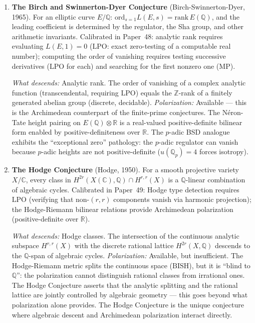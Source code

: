 \documentclass[11pt]{article}
\theoremstyle{definition}
\theoremstyle{remark}
\newcommand{\Z}{\mathbb{Z}}
\newcommand{\Q}{\mathbb{Q}}
\newcommand{\R}{\mathbb{R}}
\newcommand{\C}{\mathbb{C}}
\newcommand{\Qbar}{\overline{\Q}}
\newcommand{\Qp}{\Q_p}
\newcommand{\LPO}{\mathrm{LPO}}
\newcommand{\MP}{\mathrm{MP}}
\newcommand{\BISH}{\mathrm{BISH}}
\begin{document}
\begin{enumerate}
\emph{What descends:} The entire state space. Both the Hodge filtration (from $\Qp$-Grassmannians to $\Q$-rational de Rham cohomology) and the Frobenius traces (from $\Qp$ to $\Qbar$). \emph{Polarization:} Blocked by $u(\Qp) = 4$. The Corlette-Simpson correspondence over $\C$ uses a harmonic metric to force semisimplicity; over $\Qp$, purely algebraic workarounds (perfectoid spaces, Fargues-Fontaine curve) are required.

\item \textbf{The Birch and Swinnerton-Dyer Conjecture} (Birch-Swinnerton-Dyer, 1965). For an elliptic curve $E/\Q$: $\mathrm{ord}_{s=1} L(E,s) = \mathrm{rank}\, E(\Q)$, and the leading coefficient is determined by the regulator, the Sha group, and other arithmetic invariants. Calibrated in Paper~48: analytic rank requires evaluating $L(E,1) = 0$ ($\LPO$: exact zero-testing of a computable real number); computing the order of vanishing requires testing successive derivatives ($\LPO$ for each) and searching for the first nonzero one ($\MP$).

\emph{What descends:} Analytic rank. The order of vanishing of a complex analytic function (transcendental, requiring $\LPO$) equals the $\Z$-rank of a finitely generated abelian group (discrete, decidable). \emph{Polarization:} Available --- this is the Archimedean counterpart of the finite-prime conjectures. The N\'eron-Tate height pairing on $E(\Q) \otimes \R$ is a real-valued positive-definite bilinear form enabled by positive-definiteness over $\R$. The $p$-adic BSD analogue exhibits the ``exceptional zero'' pathology: the $p$-adic regulator can vanish because $p$-adic heights are not positive-definite ($u(\Qp) = 4$ forces isotropy).

\item \textbf{The Hodge Conjecture} (Hodge, 1950). For a smooth projective variety $X/\C$, every class in $H^{2r}(X(\C), \Q) \cap H^{r,r}(X)$ is a $\Q$-linear combination of algebraic cycles. Calibrated in Paper~49: Hodge type detection requires $\LPO$ (verifying that non-$(r,r)$ components vanish via harmonic projection); the Hodge-Riemann bilinear relations provide Archimedean polarization (positive-definite over $\R$).

\emph{What descends:} Hodge classes. The intersection of the continuous analytic subspace $H^{r,r}(X)$ with the discrete rational lattice $H^{2r}(X, \Q)$ descends to the $\Q$-span of algebraic cycles. \emph{Polarization:} Available, but insufficient. The Hodge-Riemann metric splits the continuous space ($\BISH$), but it is ``blind to $\Q$'': the polarization cannot distinguish rational classes from irrational ones. The Hodge Conjecture asserts that the analytic splitting and the rational lattice are jointly controlled by algebraic geometry --- this goes beyond what polarization alone provides. The Hodge Conjecture is the unique conjecture where algebraic descent and Archimedean polarization interact directly.
\end{enumerate}
\end{document}
